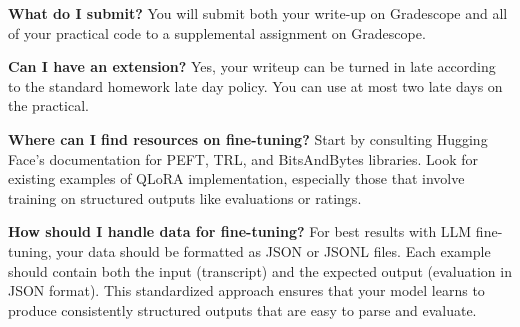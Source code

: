 \documentclass[11pt]{article}
\begin{document}
\textbf{What do I submit?} You will submit both your write-up on Gradescope and all of your practical code to a supplemental assignment on Gradescope.

\textbf{Can I have an extension?} Yes, your writeup can be turned in late according to the standard homework late day policy. You can use at most two late days on the practical.

\textbf{Where can I find resources on fine-tuning?} Start by consulting Hugging Face's documentation for PEFT, TRL, and BitsAndBytes libraries. Look for existing examples of QLoRA implementation, especially those that involve training on structured outputs like evaluations or ratings.

\textbf{How should I handle data for fine-tuning?} For best results with LLM fine-tuning, your data should be formatted as JSON or JSONL files. Each example should contain both the input (transcript) and the expected output (evaluation in JSON format). This standardized approach ensures that your model learns to produce consistently structured outputs that are easy to parse and evaluate.
\end{document}
